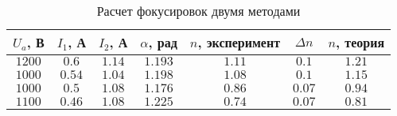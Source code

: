\begin{table}[ht!]
\begin{center}
\begin{tabular}{|c|c|c|c|c|c|c|}

\hline
$U_a$, В & $I_1$, А & $I_2$, А & $\alpha$, рад & $n$, эксперимент & $\Delta{n}$ & $n$, теория\\
\hline
$1200$ & $0.6$ 	& $1.14$ & $1.193$ 	& $1.11$ & $0.1$  	& $1.21$ \\ \hline
$1000$ & $0.54$ & $1.04$ & $1.198$ 	& $1.08$ & $0.1$ 	& $1.15$ \\ \hline
$1000$ & $0.5$ 	& $1.08$ & $1.176$ 	& $0.86$ & $0.07$  	& $0.94$ \\ \hline
$1100$ & $0.46$ & $1.08$ & $1.225$	& $0.74$ & $0.07$ 	& $0.81$ \\ \hline
\end{tabular}
\end{center}
\caption{\label{tab:n1n2}Расчет фокусировок двумя методами}
\end{table} 
